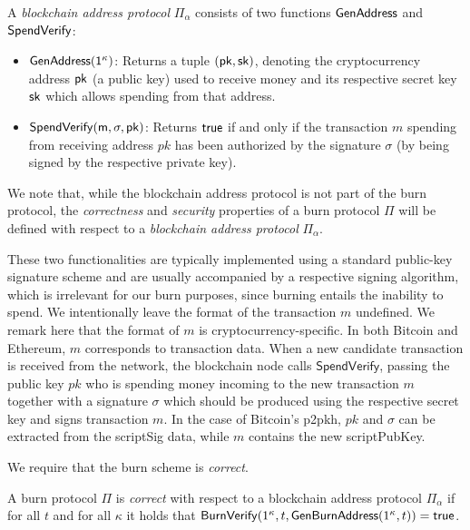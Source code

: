 \begin{definition}
  A \emph{blockchain address protocol} $\Pi_\alpha$ consists of two functions $\sf{GenAddress}$ and $\sf{SpendVerify}$:

  \begin{itemize}
    \item $\sf{GenAddress}(1^\kappa)$: Returns a tuple $(\sf{pk}, \sf{sk})$, denoting the cryptocurrency address $\sf{pk}$ (a public key) used to receive money and its respective secret key $\sf{sk}$ which allows spending from that address.

    \item $\sf{SpendVerify}(m, \sigma, pk)$: Returns $\sf{true}$ if and only if the transaction $m$ spending from receiving address $pk$ has been authorized by the signature $\sigma$ (by being signed by the respective private key).
  \end{itemize}
\end{definition}

We note that, while the blockchain address protocol is not part of the burn protocol, the \emph{correctness} and \emph{security} properties of a burn protocol $\Pi$ will be defined with respect to a \emph{blockchain address protocol} $\Pi_\alpha$.

These two functionalities are typically implemented using a standard public-key signature scheme and are usually accompanied by a respective signing algorithm, which is irrelevant for our burn purposes, since burning entails the inability to spend. We intentionally leave the format of the transaction $m$ undefined. We remark here that the format of $m$ is cryptocurrency-specific. In both Bitcoin and Ethereum, $m$ corresponds to transaction data. When a new candidate transaction is received from the network, the blockchain node calls $\textsf{SpendVerify}$, passing the public key $pk$ who is spending money incoming to the new transaction $m$ together with a signature $\sigma$ which should be produced using the respective secret key and signs transaction $m$. In the case of Bitcoin's p2pkh, $pk$ and $\sigma$ can be extracted from the scriptSig data, while $m$ contains the new scriptPubKey.

We require that the burn scheme is \emph{correct}.

\begin{definition}[Correctness]
  A burn protocol $\Pi$ is \emph{correct} with respect to a blockchain address protocol $\Pi_\alpha$ if for all $t$ and for all $\kappa$ it holds that
  $\mathsf{BurnVerify}(1^\kappa, t, \mathsf{GenBurnAddress}(1^\kappa, t)) = \textsf{true}$.
\end{definition}

